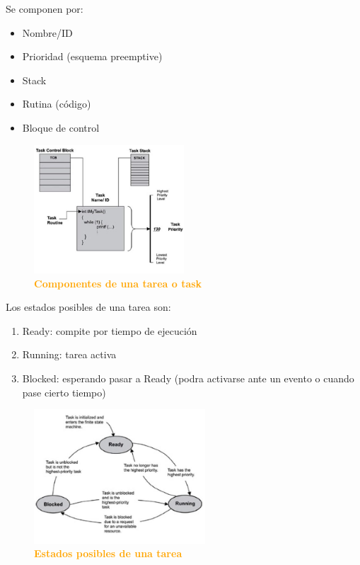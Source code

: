 \documentclass{article}
\begin{document}
Se componen por:
\begin{itemize}
\item Nombre/ID
\item Prioridad (esquema preemptive)
\item Stack
\item Rutina (código)
\item Bloque de control
\end{itemize}
\begin{figure}[H]
   \centering
   \includegraphics[width=0.5\textwidth]{figures/task1.jpg}
   \centering
   \caption{\textbf{\textcolor{Orange}{Componentes de una tarea o task}}}
\end{figure}

\clearpage

Los estados posibles de una tarea
son:
\begin{enumerate}
\item Ready: compite por tiempo de ejecución
\item Running: tarea activa 
\item Blocked: esperando pasar a Ready (podra activarse ante un evento o cuando pase cierto tiempo)
\end{enumerate}


\begin{figure}[H]
   \centering
   \includegraphics[width=0.57\textwidth]{figures/task2.jpg}
   \centering
   \caption{\textbf{\textcolor{Orange}{Estados posibles de una tarea}}}
\end{figure}
\end{document}
